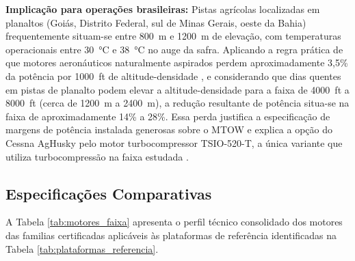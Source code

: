 \documentclass[a4paper,12pt]{article}
\begin{document}
\textbf{Implicação para operações brasileiras:} Pistas agrícolas localizadas em planaltos (Goiás, Distrito Federal, sul de Minas Gerais, oeste da Bahia) frequentemente situam-se entre \SI{800}{m} e \SI{1200}{m} de elevação, com temperaturas operacionais entre \SI{30}{\degreeCelsius} e \SI{38}{\degreeCelsius} no auge da safra. Aplicando a regra prática de que motores aeronáuticos naturalmente aspirados perdem aproximadamente 3{,}5\% da potência por \SI{1000}{ft} de altitude-densidade \cite{cfisteph_density}, e considerando que dias quentes em pistas de planalto podem elevar a altitude-densidade para a faixa de \SI{4000}{ft} a \SI{8000}{ft} (cerca de \SI{1200}{m} a \SI{2400}{m}), a redução resultante de potência situa-se na faixa de aproximadamente 14\% a 28\%. Essa perda justifica a especificação de margens de potência instalada generosas sobre o MTOW e explica a opção do Cessna AgHusky pelo motor turbocompressor TSIO-520-T, a única variante que utiliza turbocompressão na faixa estudada \cite{cessna_188}.

\subsection{Especificações Comparativas}

A Tabela \ref{tab:motores_faixa} apresenta o perfil técnico consolidado dos motores das familias certificadas aplicáveis às plataformas de referência identificadas na Tabela \ref{tab:plataformas_referencia}.
\end{document}
